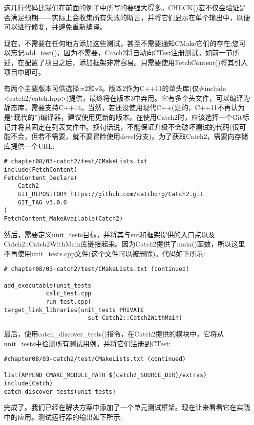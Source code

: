 这几行代码比我们在前面的例子中所写的要强大得多。CHECK()宏不仅会验证是否满足预期——实际上会收集所有失败的断言，并将它们显示在单个输出中，以便可以进行修复，并避免重新编译。

现在，不需要在任何地方添加这些测试，甚至不需要通知CMake它们的存在;您可以忘记add\_test()，因为不需要，Catch2将自动向CTest注册测试。如前一节所述，在配置了项目之后，添加框架非常容易。只需要使用FetchContent()将其引入项目中即可。

有两个主要版本可供选择:v2和v3。版本2作为C++11的单头库(仅\#include <catch2/catch.hpp>)提供，最终将在版本3中弃用。它有多个头文件，可以编译为静态库，需要支持C++14。当然，若还没使用现代C++(是的，C++11不再认为是“现代的”)编译器，建议使用更新的版本。在使用Catch2时，应该选择一个Git标记并将其固定在列表文件中。换句话说，不能保证升级不会破坏测试的代码(很可能不会，但若不需要，就不要冒险使用devel分支)。为了获取Catch2，需要向存储库提供一个URL:

\begin{lstlisting}[style=styleCMake]
# chapter08/03-catch2/test/CMakeLists.txt
include(FetchContent)
FetchContent_Declare(
	Catch2
	GIT_REPOSITORY https://github.com/catchorg/Catch2.git
	GIT_TAG v3.0.0
)
FetchContent_MakeAvailable(Catch2)
\end{lstlisting} 

然后，需要定义unit\_tests目标，并将其与sut和框架提供的入口点以及Catch2::Catch2WithMain库链接起来。因为Catch2提供了main()函数，所以这里不再使用unit\_tests.cpp文件(这个文件可以被删除)。代码如下所示:

\begin{lstlisting}[style=styleCMake]
# chapter08/03-catch2/test/CMakeLists.txt (continued)

add_executable(unit_tests
			calc_test.cpp
			run_test.cpp)
target_link_libraries(unit_tests PRIVATE
						sut Catch2::Catch2WithMain)
\end{lstlisting} 

最后，使用catch\_discover\_tests()指令，在Catch2提供的模块中，它将从unit\_tests中检测所有测试用例，并将它们注册到CTest:

\begin{lstlisting}[style=styleCMake]
#chapter08/03-catch2/test/CMakeLists.txt (continued)

list(APPEND CMAKE_MODULE_PATH ${catch2_SOURCE_DIR}/extras)
include(Catch)
catch_discover_tests(unit_tests)
\end{lstlisting} 

完成了。我们已经在解决方案中添加了一个单元测试框架。现在让来看看它在实践中的应用。测试运行器的输出如下所示:

